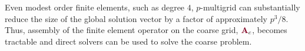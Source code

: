 Even modest order finite elements, such as degree $4$, $p$-multigrid can substantially reduce the size of the global solution vector by a factor of approximately $p^3 / 8$.
Thus, assembly of the finite element operator on the coarse grid, ${\color{burgundy}\mathbf{A}}_c$, becomes tractable and direct solvers can be used to solve the coarse problem.
